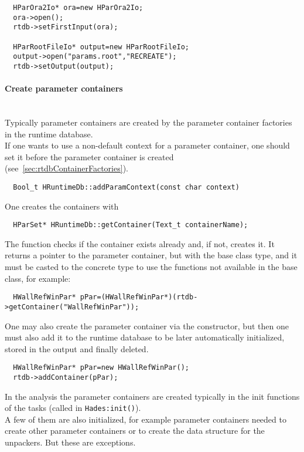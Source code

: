 \begin{lstlisting}
  HParOra2Io* ora=new HParOra2Io;
  ora->open();
  rtdb->setFirstInput(ora);

  HParRootFileIo* output=new HParRootFileIo;
  output->open("params.root","RECREATE");
  rtdb->setOutput(output);
\end{lstlisting}

\paragraph{Create parameter containers} ~\\
Typically parameter containers are created by the parameter container factories in the runtime database.\\
If one wants to use a non-default context for a parameter container, one should set it before the parameter container 
is created (see~\ref{sec:rtdbContainerFactories}).
\begin{lstlisting}
  Bool_t HRuntimeDb::addParamContext(const char context)
\end{lstlisting}

One creates the containers with
\begin{lstlisting}
  HParSet* HRuntimeDb::getContainer(Text_t containerName);
\end{lstlisting}
The function checks if the container exists already and, if not, creates it. It returns a pointer to the parameter 
container, but with the base class type, and it must be casted to the concrete type to use the functions not available 
in the base class, for example:
\begin{lstlisting}
  HWallRefWinPar* pPar=(HWallRefWinPar*)(rtdb->getContainer("WallRefWinPar"));
\end{lstlisting}

One may also create the parameter container via the constructor, but then one must also add it to the runtime database 
to be later automatically initialized, stored in the output and finally deleted.

\begin{lstlisting}
  HWallRefWinPar* pPar=new HWallRefWinPar();
  rtdb->addContainer(pPar);
\end{lstlisting}

In the analysis the parameter containers are created typically in the init functions of the tasks (called in 
\verb+Hades:init()+).\\
A few of them are also initialized, for example parameter containers needed to create other parameter containers or to 
create the data structure for the unpackers. But these are exceptions.

